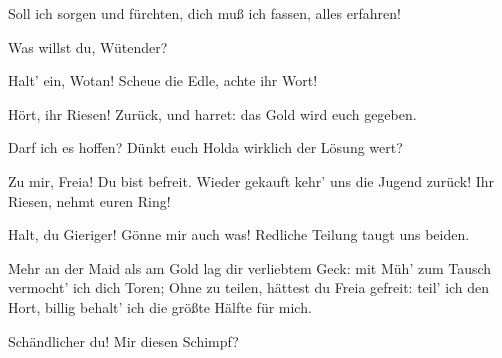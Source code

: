 \begin{drama}


\Wotanspeaks
Soll ich sorgen und fürchten,
dich muß ich fassen, alles erfahren!
 




\Frickaspeaks
Was willst du, Wütender?
 

\Frohspeaks
Halt' ein, Wotan!
Scheue die Edle, achte ihr Wort!
 




\Donnerspeaks


Hört, ihr Riesen! Zurück, und harret:
das Gold wird euch gegeben.
 

\Freiaspeaks
Darf ich es hoffen?
Dünkt euch Holda wirklich der Lösung wert?
 


\Wotanspeaks
Zu mir, Freia! Du bist befreit.
Wieder gekauft kehr' uns die Jugend zurück!
Ihr Riesen, nehmt euren Ring!
 






\Fasoltspeaks


Halt, du Gieriger! Gönne mir auch was!
Redliche Teilung taugt uns beiden.
 

\Fafnerspeaks
Mehr an der Maid als am Gold
lag dir verliebtem Geck:
mit Müh' zum Tausch vermocht' ich dich Toren;
Ohne zu teilen, hättest du Freia gefreit:
teil' ich den Hort,
billig behalt' ich die größte Hälfte für mich.
 

\Fasoltspeaks
Schändlicher du! Mir diesen Schimpf?
 




\end{drama}
